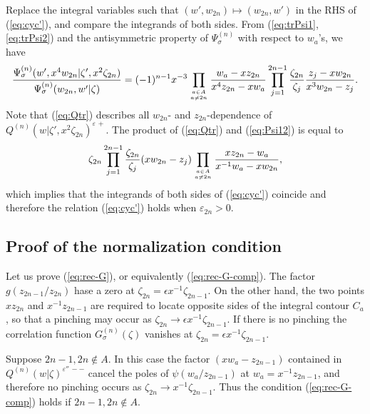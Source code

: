 \documentclass[a4paper,10pt]{article}
\begin{document}
Replace the integral variables such that 
$(w', w_{2n})\mapsto (w_{2n}, w')$ in the RHS 
of (\ref{eq:cyc'}), and compare the integrands of both 
sides. From (\ref{eq:trPsi1}, \ref{eq:trPsi2}) and the 
antisymmetric property of $\Psi^{(n)}_\sigma$ 
with respect to $w_a$'s, we have 
\begin{equation}
\frac{\Psi^{(n)}_\sigma (w', x^4 w_{2n}|
\zeta', x^2 \zeta_{2n})}{\Psi^{(n)}_\sigma 
(w_{2n}, w'|\zeta )}=(-1)^{n-1}
x^{-3} \prod_{a\in A\atop a\neq 2n} 
\frac{w_a -xz_{2n}}{x^4 z_{2n}-xw_a}
\prod_{j=1}^{2n-1} \frac{\zeta_{2n}}{\zeta_j} 
\frac{z_j -xw_{2n}}{x^3 w_{2n}-z_j}. 
\label{eq:Psi12}
\end{equation}
Note that (\ref{eq:Qtr}) describes all $w_{2n}$- and 
$z_{2n}$-dependence of 
$Q^{(n)}(w|\zeta', x^2 \zeta_{2n})^{\varepsilon\,+}$. 
The product of (\ref{eq:Qtr}) and (\ref{eq:Psi12}) 
is equal to 
$$
\zeta_{2n} 
\prod_{j=1}^{2n-1} \frac{\zeta_{2n}}{\zeta_j} 
(xw_{2n}-z_j )\prod_{a\in A\atop a\neq 2n} 
\frac{xz_{2n}-w_a}{x^{-1}w_a -xw_{2n}}, 
$$
which implies that the integrands of both sides of 
(\ref{eq:cyc'}) coincide and therefore the relation 
(\ref{eq:cyc'}) holds when $\varepsilon_{2n}>0$. 

\subsection{Proof of the normalization condition} 

Let us prove (\ref{eq:rec-G}), or equivalently 
(\ref{eq:rec-G-comp}). 
The factor $g(z_{2n-1}/z_{2n})$ hase a zero at 
$\zeta_{2n}=\epsilon x^{-1}\zeta_{2n-1}$. 
On the other hand, 
the two points $xz_{2n}$ and $x^{-1}z_{2n-1}$ are 
required to locate opposite sides of the integral 
contour $C_a$, so that a pinching may occur as 
$\zeta_{2n}\rightarrow \epsilon x^{-1}\zeta_{2n-1}$. 
If there is no pinching the correlation function 
$G^{(n)}_\sigma (\zeta )$ vanishes at 
$\zeta_{2n}=\epsilon x^{-1}\zeta_{2n-1}$. 

Suppose $2n-1, 2n\not\in A$. In this case 
the factor $(xw_a -z_{2n-1})$ contained in 
$Q^{(n)}(w|\zeta)^{\varepsilon''\,--}$ cancel the poles of 
$\psi (w_a /z_{2n-1})$ at $w_a =x^{-1}z_{2n-1}$, 
and therefore no pinching occurs as 
$\zeta_{2n}\rightarrow x^{-1}\zeta_{2n-1}$. 
Thus the condition (\ref{eq:rec-G-comp}) holds 
if $2n-1, 2n\not\in A$. 
\end{document}
